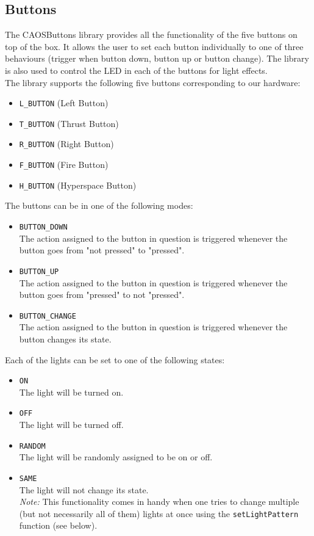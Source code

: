 \documentclass{report}
\begin{document}
\subsection{Buttons}
The CAOSButtons library provides all the functionality of the five buttons on top of the box. It allows the user to set each button individually to one of three behaviours (trigger when button down, button up or button change).
The library is also used to control the LED in each of the buttons for light effects. \\
The library supports the following five buttons corresponding to our hardware:
\begin{itemize}
	\item \lstinline{L_BUTTON}  (Left Button)
	\item \lstinline{T_BUTTON}  (Thrust Button)
	\item \lstinline{R_BUTTON}  (Right Button)
	\item \lstinline{F_BUTTON}  (Fire Button)
	\item \lstinline{H_BUTTON}  (Hyperspace Button)
\end{itemize}
The buttons can be in one of the following modes:
\begin{itemize}
	\item \lstinline{BUTTON_DOWN} \\
		The action assigned to the button in question is triggered whenever the button goes from "not pressed" to "pressed".
	\item \lstinline{BUTTON_UP} \\
		The action assigned to the button in question is triggered whenever the button goes from "pressed" to not "pressed".
	\item \lstinline{BUTTON_CHANGE} \\
		The action assigned to the button in question is triggered whenever the button changes its state.
\end{itemize}
Each of the lights can be set to one of the following states:
\begin{itemize}
	\item \lstinline{ON} \\
		The light will be turned on.
	\item \lstinline{OFF} \\
		The light will be turned off.
	\item \lstinline{RANDOM} \\
		The light will be randomly assigned to be on or off.
	\item \lstinline{SAME} \\
		The light will not change its state. \\
		\emph{Note:} This functionality comes in handy when one tries to change multiple (but not necessarily all of them) lights at once using the \lstinline{setLightPattern} function (see below).
\end{itemize}
\end{document}
